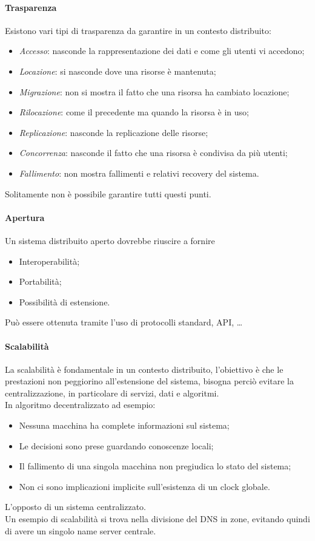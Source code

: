 \paragraph{Trasparenza}
Esistono vari tipi di trasparenza da garantire in un contesto distribuito:
\begin{itemize}
    \item \emph{Accesso}: nasconde la rappresentazione dei dati 
    e come gli utenti vi accedono;
    \item \emph{Locazione}: si nasconde dove una risorse è mantenuta;
    \item \emph{Migrazione}: non si mostra il fatto che una risorsa ha cambiato 
    locazione;
    \item \emph{Rilocazione}: come il precedente ma quando la risorsa è in uso;
    \item \emph{Replicazione}: nasconde la replicazione delle risorse;
    \item \emph{Concorrenza}: nasconde il fatto che una risorsa è condivisa
    da più utenti;
    \item \emph{Fallimento}: non mostra fallimenti e relativi recovery del sistema.
\end{itemize}
Solitamente non è possibile garantire tutti questi punti.

\paragraph{Apertura}
Un sistema distribuito aperto dovrebbe riuscire a fornire
\begin{itemize}
    \item Interoperabilità;
    \item Portabilità;
    \item Possibilità di estensione.
\end{itemize}
Può essere ottenuta tramite l'uso di protocolli standard, API, \dots

\paragraph{Scalabilità}
La scalabilità è fondamentale in un contesto distribuito, 
l'obiettivo è che le prestazioni non peggiorino all'estensione
del sistema, bisogna perciò evitare la centralizzazione, 
in particolare di servizi, dati e algoritmi.\\
In algoritmo decentralizzato ad esempio:
\begin{itemize}
    \item Nessuna macchina ha complete informazioni sul sistema;
    \item Le decisioni sono prese guardando conoscenze locali;
    \item Il fallimento di una singola macchina non pregiudica lo stato
    del sistema;
    \item Non ci sono implicazioni implicite sull'esistenza di un clock globale.
\end{itemize}
L'opposto di un sistema centralizzato.\\
Un esempio di scalabilità si trova nella divisione del DNS in zone, 
evitando quindi di avere un singolo name server centrale.

